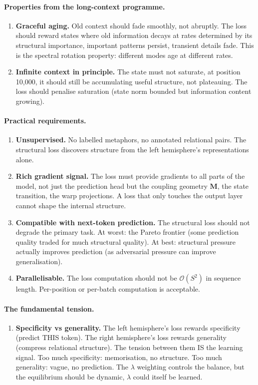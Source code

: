 \documentclass[11pt, a4paper]{article}
\newcommand{\M}{\mathbf{M}}
\theoremstyle{plain}
\theoremstyle{definition}
\theoremstyle{remark}
\begin{document}
\paragraph{Properties from the long-context programme.}
\begin{enumerate}
\item \textbf{Graceful aging.} Old context should fade smoothly, not abruptly. The loss should reward states where old information decays at rates determined by its structural importance, important patterns persist, transient details fade. This is the spectral rotation property: different modes age at different rates.
\item \textbf{Infinite context in principle.} The state must not saturate, at position 10,000, it should still be accumulating useful structure, not plateauing. The loss should penalise saturation (state norm bounded but information content growing).
\end{enumerate}

\paragraph{Practical requirements.}
\begin{enumerate}
\item \textbf{Unsupervised.} No labelled metaphors, no annotated relational pairs. The structural loss discovers structure from the left hemisphere's representations alone.
\item \textbf{Rich gradient signal.} The loss must provide gradients to all parts of the model, not just the prediction head but the coupling geometry $\M$, the state transition, the warp projections. A loss that only touches the output layer cannot shape the internal structure.
\item \textbf{Compatible with next-token prediction.} The structural loss should not degrade the primary task. At worst: the Pareto frontier (some prediction quality traded for much structural quality). At best: structural pressure actually improves prediction (as adversarial pressure can improve generalisation).
\item \textbf{Parallelisable.} The loss computation should not be $\mathcal{O}(S^2)$ in sequence length. Per-position or per-batch computation is acceptable.
\end{enumerate}

\paragraph{The fundamental tension.}
\begin{enumerate}
\item \textbf{Specificity vs generality.} The left hemisphere's loss rewards specificity (predict THIS token). The right hemisphere's loss rewards generality (compress relational structure). The tension between them IS the learning signal. Too much specificity: memorisation, no structure. Too much generality: vague, no prediction. The $\lambda$ weighting controls the balance, but the equilibrium should be dynamic, $\lambda$ could itself be learned.
\end{enumerate}
\end{document}
